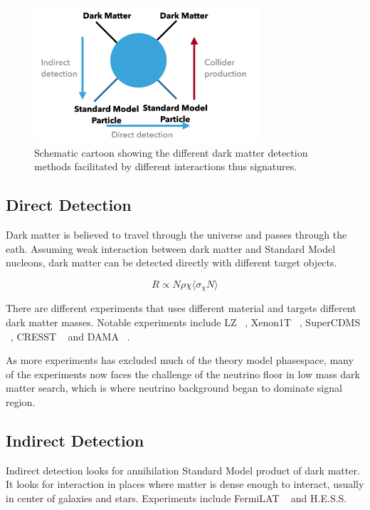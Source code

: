 \begin{figure}[!htb]
    \begin{center}
        \includegraphics[width=0.75\textwidth]{figures/chapter_DM/Interaction}
        \caption{
			Schematic cartoon showing the different dark matter detection methods facilitated by different interactions thus signatures. 
        }
        \label{fig:interaction}
    \end{center}
\end{figure}

\subsection{Direct Detection}
Dark matter is believed to travel through the universe and passes through the eath. Assuming weak interaction between dark matter and Standard Model nucleons, dark matter can be detected directly with different target objects. 

\[ R \propto N \rho \chi \langle \sigma_{\chi } N \rangle \]

There are different experiments that uses different material and targets different dark matter masses.
Notable experiments include LZ ~\cite{mckinsey2016lz},   Xenon1T ~\cite{aprile2020excess}, SuperCDMS ~\cite{Agnese_2016}, CRESST ~\cite{Angloher_2014} and DAMA ~\cite{Bernabei_2008}. 

As more experiments has excluded much of the theory model phasespace, many of the experiments now faces the challenge of the neutrino floor in low mass dark matter search, which is where neutrino background began to dominate signal region. 



\subsection{Indirect Detection}
Indirect detection looks for annihilation Standard Model product of dark matter. It looks for interaction in places where matter is dense enough to interact, usually in center of galaxies and stars. Experiments include FermiLAT ~\cite{albert2017searching} and H.E.S.S. ~\cite{aharonian2006hess}


